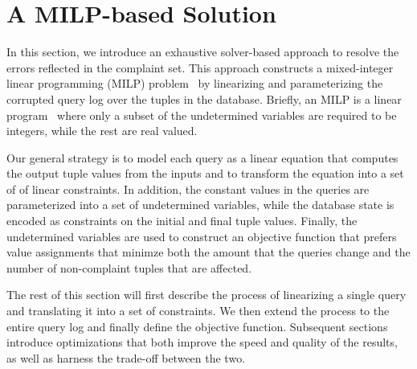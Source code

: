 
\section{A MILP-based Solution}
\label{sec:sol}

In this section, we introduce an exhaustive solver-based approach to 
resolve the errors reflected in the complaint set.
This approach constructs a mixed-integer linear 
programming (MILP) problem~\cite{milp} by linearizing and parameterizing the 
corrupted query log over the tuples in the database. 
Briefly, an MILP is a linear program~\cite{} where only a subset of the undetermined variables
are required to be integers, while the rest are real valued.

Our general strategy is to model each query as a linear equation 
that computes the output tuple values from the inputs and to transform the
equation into a set of of linear constraints.   
In addition, the constant values in the queries are parameterized
into a set of undetermined variables, while the database state is encoded 
as constraints on the initial and final tuple values.
Finally, the undetermined variables are used to construct an objective function
that prefers value assignments that minimze both the amount that the queries change and
the number of non-complaint tuples that are affected. 

The rest of this section will first describe the process of linearizing a single query
and translating it into a set of constraints.  We then extend the process to the entire
query log and finally define the objective function.
Subsequent sections introduce optimizations that both
improve the speed and quality of the results, as well as harness the trade-off between the two. 








